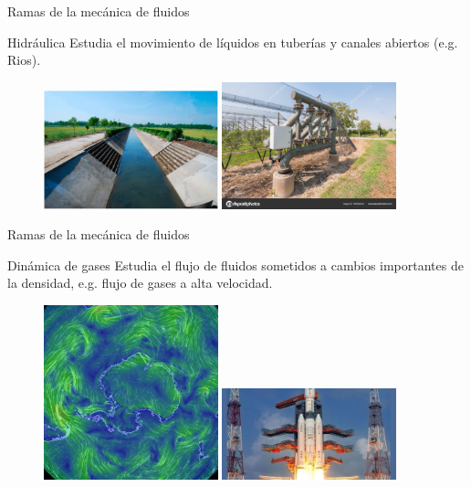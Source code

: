 \documentclass [xcolor=svgnames, t] {beamer}
\begin{document}
\begin{frame}{Ramas de la mecánica de fluidos}
\begin{block}{Hidráulica}
Estudia el movimiento de líquidos en tuberías y canales abiertos (e.g. Rios).
\end{block}
\begin{figure}
\centering
\includegraphics[width=0.45\textwidth]{hydra1}
\includegraphics[width=0.45\textwidth]{hydra2}
\end{figure}
\end{frame}

\begin{frame}{Ramas de la mecánica de fluidos}
\begin{block}{Dinámica de gases}
Estudia el flujo de fluidos sometidos a cambios importantes de la densidad, e.g. flujo de gases a alta velocidad.
\end{block}
\begin{figure}
\centering
\includegraphics[width=0.45\textwidth]{gasd1}
\includegraphics[width=0.45\textwidth]{gasd2}
\end{figure}
\end{frame}
\end{document}
